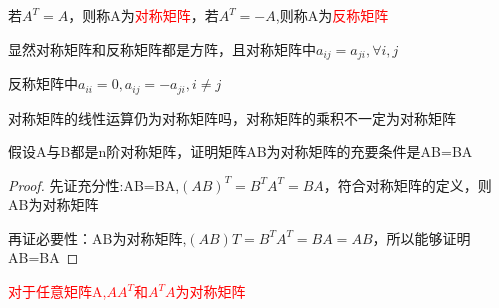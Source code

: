 若$A^T=A$，则称A为\textcolor{red}{对称矩阵}，若$A^T=-A$,则称A为\textcolor{red}{反称矩阵}

显然对称矩阵和反称矩阵都是方阵，且对称矩阵中$a_{ij}=a_{ji},\forall  i,j$

反称矩阵中$a_{ii}=0,a_{ij}=-a_{ji},i\neq j$

对称矩阵的线性运算仍为对称矩阵吗，对称矩阵的乘积不一定为对称矩阵

\begin{example}
	假设A与B都是n阶对称矩阵，证明矩阵AB为对称矩阵的充要条件是AB=BA

	\begin{proof}
		先证充分性:AB=BA,$(AB)^T=B^TA^T=BA$，符合对称矩阵的定义，则AB为对称矩阵

		再证必要性：AB为对称矩阵,$(AB)T=B^TA^T=BA=AB$，所以能够证明AB=BA
	\end{proof}

	\textcolor{red}{对于任意矩阵A,$AA^T$和$A^TA$为对称矩阵}

\end{example}